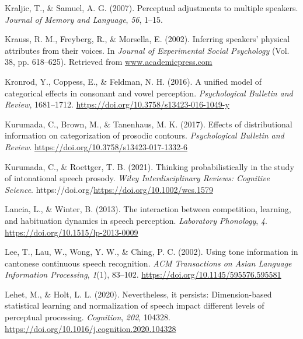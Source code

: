 \documentclass[
  11pt,
  english,
  man,floatsintext]{apa6}
\newlength{\cslhangindent}
\newlength{\cslentryspacingunit} %
\newenvironment{CSLReferences}[2] %
 {%
  \setlength{\parindent}{0pt}
  \ifodd #1
  \let\oldpar\par
  \def\par{\hangindent=\cslhangindent\oldpar}
  \fi
  \setlength{\parskip}{#2\cslentryspacingunit}
 }%
 {}
\begin{document}
\begin{CSLReferences}{1}{0}
\leavevmode{}%
Kraljic, T., \& Samuel, A. G. (2007). Perceptual adjustments to multiple speakers. \emph{Journal of Memory and Language}, \emph{56}, 1--15.

\leavevmode{}%
Krauss, R. M., Freyberg, R., \& Morsella, E. (2002). Inferring speakers' physical attributes from their voices. In \emph{Journal of Experimental Social Psychology} (Vol. 38, pp. 618--625). Retrieved from \href{https://www.academicpress.com}{www.academicpress.com}

\leavevmode{}%
Kronrod, Y., Coppess, E., \& Feldman, N. H. (2016). A unified model of categorical effects in consonant and vowel perception. \emph{Psychological Bulletin and Review}, 1681--1712. \url{https://doi.org/10.3758/s13423-016-1049-y}

\leavevmode{}%
Kurumada, C., Brown, M., \& Tanenhaus, M. K. (2017). Effects of distributional information on categorization of prosodic contours. \emph{Psychological Bulletin and Review}. \url{https://doi.org/10.3758/s13423-017-1332-6}

\leavevmode{}%
Kurumada, C., \& Roettger, T. B. (2021). Thinking probabilistically in the study of intonational speech prosody. \emph{Wiley Interdisciplinary Reviews: Cognitive Science}. https://doi.org/\url{https://doi.org/10.1002/wcs.1579}

\leavevmode{}%
Lancia, L., \& Winter, B. (2013). The interaction between competition, learning, and habituation dynamics in speech perception. \emph{Laboratory Phonology}, \emph{4}. \url{https://doi.org/10.1515/lp-2013-0009}

\leavevmode{}%
Lee, T., Lau, W., Wong, Y. W., \& Ching, P. C. (2002). Using tone information in cantonese continuous speech recognition. \emph{ACM Transactions on Asian Language Information Processing}, \emph{1}(1), 83--102. \url{https://doi.org/10.1145/595576.595581}

\leavevmode{}%
Lehet, M., \& Holt, L. L. (2020). Nevertheless, it persists: Dimension-based statistical learning and normalization of speech impact different levels of perceptual processing. \emph{Cognition}, \emph{202}, 104328. \url{https://doi.org/10.1016/j.cognition.2020.104328}


\end{CSLReferences}
\end{document}
